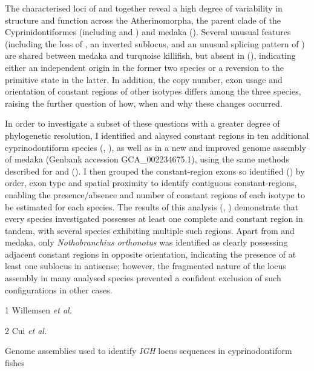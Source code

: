 The characterised \igh{} loci of \nfu and \xma together reveal a high degree of variability in structure and function across the Atherinomorpha, the parent clade of the Cyprinidontiformes (including \Nfu and \Xma) and medaka (). Several unusual features (including the loss of , an inverted sublocus, and an unusual splicing pattern of ) are shared between medaka and turquoise killifish, but absent in \Xma (), indicating either an independent origin in the former two species or a reversion to the primitive state in the latter. In addition, the copy number, exon usage and orientation of constant regions of other isotypes differs among the three species, raising the further question of how, when and why these changes occurred. 

In order to investigate a subset of these questions with a greater degree of phylogenetic resolution, I identified and alaysed \igh{} constant regions in ten additional cyprinodontiform species (, ), as well as in a new and improved genome assembly of medaka (Genbank accession GCA\_002234675.1), using the same methods described for \Nfu and \Xma (). I then grouped the constant-region exons so identified () by order, exon type and spatial proximity to identify contiguous constant-regions, enabling the presence/absence and number of constant regions of each isotype to be estimated for each species. The results of this analysis (, ) demonstrate that every species investigated possesses at least one complete  and  constant region in tandem, with several species exhibiting multiple such regions. Apart from \Nfu and medaka, only \textit{Nothobranchius orthonotus} was identified as clearly possessing adjacent constant regions in opposite orientation, indicating the presence of at least one sublocus in antisense; however, the fragmented nature of the \igh{} locus assembly in many analysed species prevented a confident exclusion of such configurations in other cases.

\begin{table}[bh!]
\centering
\begin{threeparttable}

\begin{tablenotes}
\item[1] Willemsen \textit{et al.} \parencite{willemsen2019popgen}
\item[2] Cui \textit{et al.} \parencite{cui2019annual}
\end{tablenotes}
\end{threeparttable}
\vspace{0.5em}
\caption{Genome assemblies used to identify \textit{IGH} locus sequences in cyprinodontiform fishes}
\label{tab:cyprinodontiform-genomes}
\end{table}

